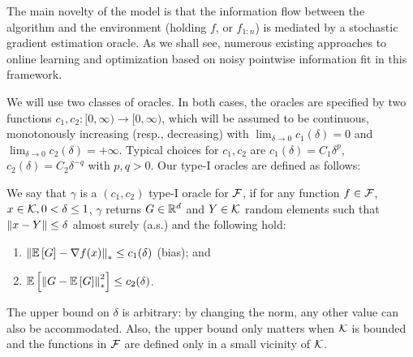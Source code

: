 The main novelty of the model is that the information flow between the algorithm and the environment (holding $f$, or $f_{1:n}$) is mediated by a stochastic gradient estimation oracle. As we shall see, numerous existing approaches to online learning and optimization based on noisy pointwise information fit in this framework.

We will use two classes of oracles. In both cases, the oracles are specified by
two functions $c_1,c_2:[0,\infty)\to [0,\infty)$, which will be assumed to be continuous,
monotonously increasing (resp., decreasing) with
$\lim_{\delta\to  0} c_1(\delta)=0$ and $\lim_{\delta\to 0} c_2(\delta)=+\infty$.
Typical choices for $c_1,c_2$ are $c_1(\delta) = C_1 \delta^p$, $c_2(\delta) = C_2\delta^{-q}$ with $p,q>0$.
Our type-I oracles are defined as follows:
\vspace{-0.2cm}
\begin{definition}
\label{def:oracle1}
We say that $\gamma$ is a  $(c_1,c_2)$ type-I oracle for $\mathcal{F}$, if for any function $f\in \mathcal{F}$,
$x\in \mathcal{K},0<\delta\le 1$, $\gamma$ returns $G\in \mathbb{R}^d$ and  $Y\in \mathcal{K}$ random elements such that
$\left\|x-Y\right\|\le \delta$ almost surely (a.s.) and the following hold:
\vspace{-0.2cm}
\begin{enumerate}
\item $\left\| \mathbb{E}\left[G\right]  - \nabla f(x)  \right\|_* \le c_1(\delta) $ (bias); and
\item $\mathbb{E}\left[\left\| G -  \mathbb{E}\left[G\right] \right\|_*^2\right] \le c_2(\delta)$.
\end{enumerate}
\vspace{-0.1cm}
\end{definition}
The upper bound on $\delta$ is arbitrary: by changing the norm, any other value can also be accommodated. Also, the upper bound only matters when $\mathcal{K}$ is bounded and the functions in $\mathcal{F}$ are defined only in a small vicinity of $\mathcal{K}$.

